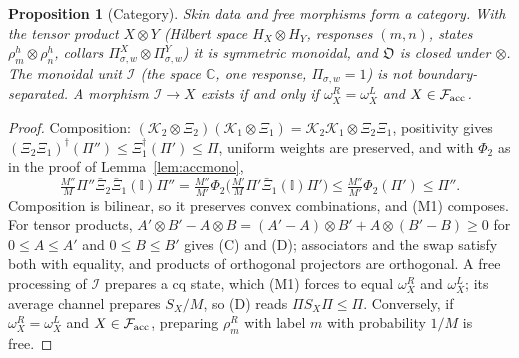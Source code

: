 \documentclass[11pt]{article}
\newtheorem{proposition}[theorem]{Proposition}
\theoremstyle{definition}
\theoremstyle{remark}
\newcommand{\one}{\mathbb{I}}
\newcommand{\Obj}{\mathfrak{O}}
\newcommand{\Free}{\mathcal{F}}
\begin{document}
\begin{proposition}[Category]\label{prop:cat}
Skin data and free morphisms form a category. With the tensor product $X\otimes Y$ (Hilbert space $H_X\otimes H_Y$, responses $(m,n)$, states $\rho^h_m\otimes\rho^h_n$, collars $\Pi^X_{\sigma,w}\otimes\Pi^Y_{\sigma,w}$) it is symmetric monoidal, and $\Obj$ is closed under $\otimes$. The monoidal unit $\mathcal I$ (the space $\mathbb C$, one response, $\Pi_{\sigma,w}=1$) is not boundary-separated. A morphism $\mathcal I\to X$ exists if and only if $\omega^R_X=\omega^L_X$ and $X\in\Free_{\rm acc}$.
\end{proposition}
\begin{proof}
Composition: $(\mathcal K_2\otimes\Xi_2)(\mathcal K_1\otimes\Xi_1)=\mathcal K_2\mathcal K_1\otimes\Xi_2\Xi_1$, positivity gives $(\Xi_2\Xi_1)^\dagger(\Pi'')\le\Xi_1^\dagger(\Pi')\le\Pi$, uniform weights are preserved, and with $\Phi_2$ as in the proof of Lemma~\ref{lem:accmono},
\[
\tfrac{M''}{M}\Pi''\bar\Xi_2\bar\Xi_1(\one)\Pi''=\tfrac{M''}{M'}\Phi_2\bigl(\tfrac{M'}{M}\Pi'\bar\Xi_1(\one)\Pi'\bigr)\le\tfrac{M''}{M'}\Phi_2(\Pi')\le\Pi'' .
\]
Composition is bilinear, so it preserves convex combinations, and (M1) composes. For tensor products, $A'\otimes B'-A\otimes B=(A'-A)\otimes B'+A\otimes(B'-B)\ge0$ for $0\le A\le A'$ and $0\le B\le B'$ gives (C) and (D); associators and the swap satisfy both with equality, and products of orthogonal projectors are orthogonal. A free processing of $\mathcal I$ prepares a cq state, which (M1) forces to equal $\omega^R_X$ and $\omega^L_X$; its average channel prepares $S_X/M$, so (D) reads $\Pi S_X\Pi\le\Pi$. Conversely, if $\omega^R_X=\omega^L_X$ and $X\in\Free_{\rm acc}$, preparing $\rho^R_m$ with label $m$ with probability $1/M$ is free.
\end{proof}
\end{document}
